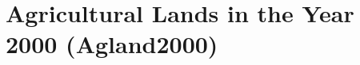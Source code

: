 \begin{comment}
\section{Cropland Data Layer (CDL)}
\label{sec:cdl}

\missingfigure{Table or chart showing CDL covereage for various years}

The CDL is only available for a small number of states in 2001.  If
time allows it might be good to compare what is available with our
results as another independent evaluation against a higher-resolution
data set.

\subsection{Reclassification}
\label{sec:cdl-reclass}





\todo{Calculate CDL mask for 5-arcmin cells completely filled}
\todo(Calculate CDL aggregated in GRASS}




\missingfigure{CDL reclassification table}

\subsection{Aggregation}
\label{sec:cdl-aggr}
\end{comment}

\section{Agricultural Lands in the Year 2000 (Agland2000)}
\label{sec:agland2000}


